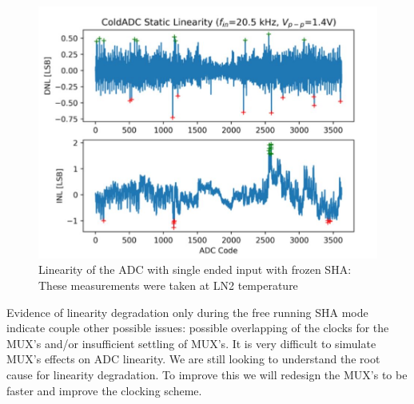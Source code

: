 \begin{figure}[h!]
\centering
  \includegraphics[width=0.7\linewidth]{figures/prakash_fig/linearity_frozensha.JPG}
  \caption[Linearity of the ADC with single ended input with frozen SHA]{Linearity of the ADC with single ended input with frozen SHA: These measurements were taken at LN2 temperature}
  \label{fig:linearity_frozensha}
\end{figure}

Evidence of linearity degradation only during the free running SHA mode indicate couple other possible issues: possible overlapping of the clocks for the MUX's and/or insufficient settling of MUX's. It is very difficult to simulate MUX's effects on ADC linearity. We are still looking to understand the root cause for linearity degradation. To improve this we will redesign the MUX's to be faster and improve the clocking scheme. 
